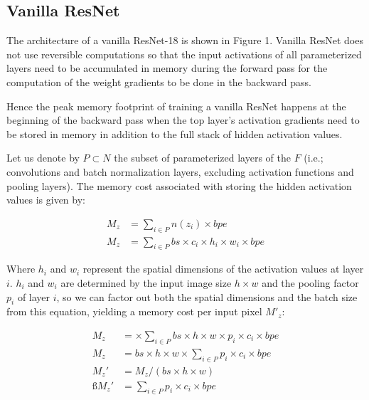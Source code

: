 \documentclass[twocolumn]{bmcart}
\begin{document}
\subsection{Vanilla ResNet}

The architecture of a vanilla ResNet-18 is shown in Figure 1.
Vanilla ResNet does not use reversible computations so that the input activations of all parameterized layers need to be accumulated in memory during the forward pass for the computation of the weight gradients to be done in the backward pass.

Hence the peak memory footprint of training a vanilla ResNet happens at the beginning of the backward pass when the top layer's activation gradients need to be stored in memory in addition to the full stack of hidden activation values.

Let us denote by $P \subset N$ the subset of parameterized layers of the $F$ 
(i.e.; convolutions and batch normalization layers, excluding activation functions and pooling layers). 
The memory cost associated with storing the hidden activation values is given by: 

\begin{subequations}
\begin{align}
M_{z} &= \sum_{i \in P} n(z_i) \times bpe \\
M_{z} &= \sum_{i \in P} bs \times c_i \times h_i \times w_i \times bpe 
\end{align}
\end{subequations}

Where $h_i$ and $w_i$ represent the spatial dimensions of the activation values at layer $i$.
$h_i$ and $w_i$ are determined by the input image size $h \times w$ and the pooling factor $p_i$ of layer $i$, so we can factor out both the spatial dimensions and the batch size from this equation, yielding a memory cost per input pixel $M'_z$:

\begin{subequations}
\begin{align}
M_{z} &= \times \sum_{i \in P} bs \times h \times w \times p_i \times c_i \times bpe \\
M_{z} &= bs \times h \times w \times \sum_{i \in P} p_i \times c_i \times bpe \\
M_{z}' &= M_{z} / (bs \times h \times w)  \\ß
M_{z}' &= \sum_{i \in P} p_i \times c_i \times bpe 
\end{align}
\end{subequations}
\end{document}
